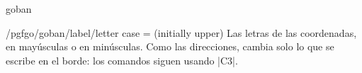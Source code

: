\begin{environment}{{goban}}
	\begin{key}{/pgfgo/goban/label/letter case =  (initially upper)}
		Las letras de las coordenadas, en mayúsculas o en minúsculas. Como las direcciones, cambia solo lo que se escribe en el borde: los comandos siguen usando |C3|.

		\begin{codeexample}[]
			\begin{goban}[5, label = {at = {south, west}, letter case = lower}]
			\end{goban}
		\end{codeexample}
	\end{key}
	
\end{environment}
